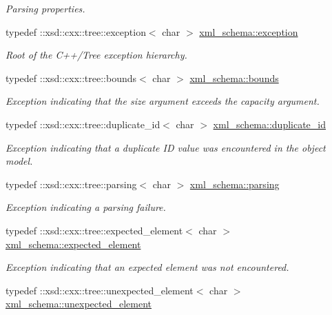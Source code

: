 \begin{DoxyCompactItemize}
\begin{DoxyCompactList}\small\item\em Parsing properties. \end{DoxyCompactList}\item 
typedef \+::xsd\+::cxx\+::tree\+::exception$<$ char $>$ \hyperlink{namespacexml__schema_a7eb0fa6af3de36ea17011d26a731b62b}{xml\+\_\+schema\+::exception}
\begin{DoxyCompactList}\small\item\em Root of the C++/\+Tree exception hierarchy. \end{DoxyCompactList}\item 
typedef \+::xsd\+::cxx\+::tree\+::bounds$<$ char $>$ \hyperlink{namespacexml__schema_a00337f2f08dbcb24280f5cf7b96224ea}{xml\+\_\+schema\+::bounds}
\begin{DoxyCompactList}\small\item\em Exception indicating that the size argument exceeds the capacity argument. \end{DoxyCompactList}\item 
typedef \+::xsd\+::cxx\+::tree\+::duplicate\+\_\+id$<$ char $>$ \hyperlink{namespacexml__schema_a22a2b3c973b87b06c2868d85a154fd63}{xml\+\_\+schema\+::duplicate\+\_\+id}
\begin{DoxyCompactList}\small\item\em Exception indicating that a duplicate I\+D value was encountered in the object model. \end{DoxyCompactList}\item 
typedef \+::xsd\+::cxx\+::tree\+::parsing$<$ char $>$ \hyperlink{namespacexml__schema_a150f88d7d2156ae81807b142038684f5}{xml\+\_\+schema\+::parsing}
\begin{DoxyCompactList}\small\item\em Exception indicating a parsing failure. \end{DoxyCompactList}\item 
typedef \+::xsd\+::cxx\+::tree\+::expected\+\_\+element$<$ char $>$ \hyperlink{namespacexml__schema_a4b608c951db27c574552da0bda062e1a}{xml\+\_\+schema\+::expected\+\_\+element}
\begin{DoxyCompactList}\small\item\em Exception indicating that an expected element was not encountered. \end{DoxyCompactList}\item 
typedef \+::xsd\+::cxx\+::tree\+::unexpected\+\_\+element$<$ char $>$ \hyperlink{namespacexml__schema_a55835ab195e4c70bc05de5bbac871110}{xml\+\_\+schema\+::unexpected\+\_\+element}

\end{DoxyCompactItemize}
